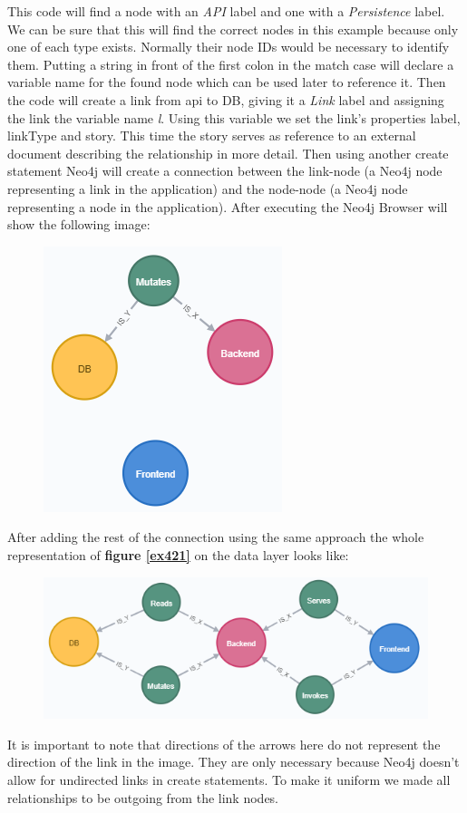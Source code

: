 This code will find a node with an \emph{API} label and one with a \emph{Persistence} label. We can be sure that this will find the correct nodes in this example because only one of each type exists. Normally their node IDs would be necessary to identify them. Putting a string in front of the first colon in the match case will declare a variable name for the found node which can be used later to reference it. Then the code will create a link from api to DB, giving it a \emph{Link} label and assigning the link the variable name \emph{l}. Using this variable we set the link's properties label, linkType and story. This time the story serves as reference to an external document describing the relationship in more detail. Then using another create statement Neo4j will create a connection between the link-node (a Neo4j node representing a link in the application) and the node-node (a Neo4j node representing a node in the application). After executing the Neo4j Browser will show the following image:
\begin{figure}[H]
\centering
\includegraphics[scale=1]{Bilder/BasicGraphNeo2.png}
\label{ex423}
\end{figure}

After adding the rest of the connection using the same approach the whole representation of \textbf{figure \ref{ex421}} on the data layer looks like:
\begin{figure}[H]
\centering
\includegraphics[scale=1]{Bilder/BasicGraphNeo3.png}
\label{ex423}
\end{figure}
It is important to note that directions of the arrows here do not represent the direction of the link in the image. They are only necessary because Neo4j doesn't allow for undirected links in create statements. To make it uniform we made all relationships to be outgoing from the link nodes.

